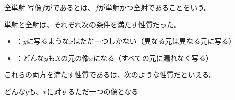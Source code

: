 \documentclass[../../../topic_linear-algebra]{subfiles}
\begin{document}
\begin{definition*}{全単射}
  写像$f$がであるとは、$f$が単射かつ全射であることをいう。
\end{definition*}

単射と全射は、それぞれ次の条件を満たす性質だった。
\begin{itemize}
  \item {}：$y$に写るような$x$はただ一つしかない（異なる元は異なる元に写る）
  \item {}：どんな$y$も$X$の元の像$x$になる（すべての元に漏れなく写る）
\end{itemize}

これらの両方を満たす性質であるは、次のような性質だといえる。
\begin{emphabox}
  \begin{spacebox}
    \begin{center}
      どんな$y$も、$x$に対するただ一つの像となる
    \end{center}
  \end{spacebox}
\end{emphabox}
\end{document}
